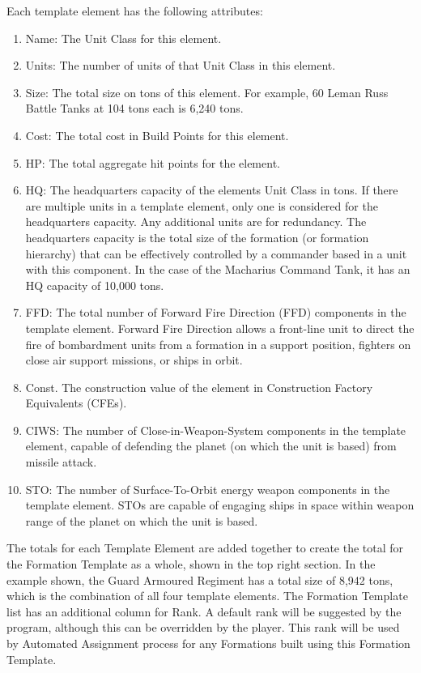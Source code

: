 \documentclass[../Aurora C# unofficial manual.tex]{subfiles}
\begin{document}
	Each template element has the following attributes:
	\begin{enumerate}
		\item Name: The Unit Class for this element.
		\item Units: The number of units of that Unit Class in this element.
		\item Size: The total size on tons of this element. For example, 60 Leman Russ Battle Tanks at 104 tons each is 6,240 tons.
		\item Cost: The total cost in Build Points for this element.
		\item HP: The total aggregate hit points for the element.
		\item HQ: The headquarters capacity of the elements Unit Class in tons. If there are multiple units in a template element, only one is considered for the headquarters capacity. Any additional units are for redundancy. The headquarters capacity is the total size of the formation (or formation hierarchy) that can be effectively controlled by a commander based in a unit with this component. In the case of the Macharius Command Tank, it has an HQ capacity of 10,000 tons.
		\item FFD: The total number of Forward Fire Direction (FFD) components in the template element. Forward Fire Direction allows a front-line unit to direct the fire of bombardment units from a formation in a support position, fighters on close air support missions, or ships in orbit.
		\item Const. The construction value of the element in Construction Factory Equivalents (CFEs).
		\item CIWS: The number of Close-in-Weapon-System components in the template element, capable of defending the planet (on which the unit is based) from missile attack.
		\item STO: The number of Surface-To-Orbit energy weapon components in the template element. STOs are capable of engaging ships in space within weapon range of the planet on which the unit is based.
	\end{enumerate} 
	
	The totals for each Template Element are added together to create the total for the Formation Template as a whole, shown in the top right section. In the example shown, the Guard Armoured Regiment has a total size of 8,942 tons, which is the combination of all four template elements. The Formation Template list has an additional column for Rank. A default rank will be suggested by the program, although this can be overridden by the player. This rank will be used by Automated Assignment process for any Formations built using this Formation Template.
	
\end{document}
